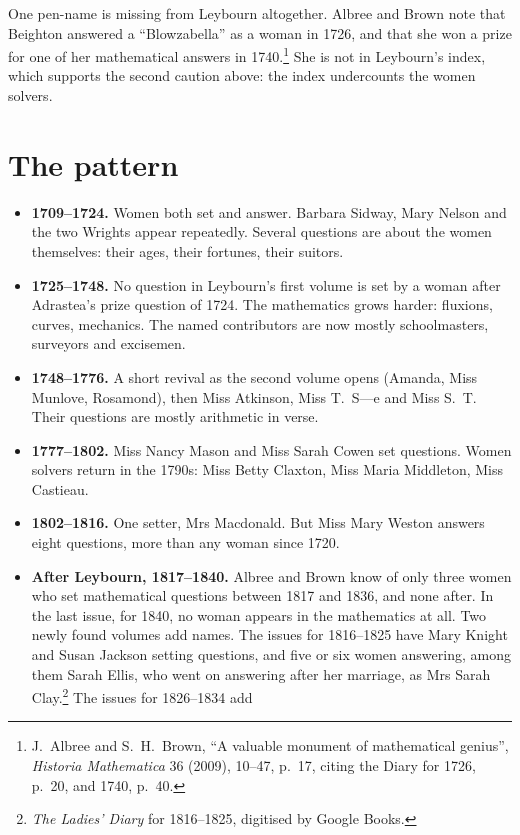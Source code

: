 \documentclass[11pt,a4paper]{article}
\begin{document}
One pen-name is missing from Leybourn altogether. Albree and Brown note that Beighton
answered a ``Blowzabella'' as a woman in 1726, and that she won a prize for one of her
mathematical answers in 1740.\footnote{J.~Albree and S.~H.~Brown, ``A valuable monument of mathematical genius'', \textit{Historia Mathematica} 36 (2009), 10--47, p.~17, citing the Diary for 1726,
p.~20, and 1740, p.~40.} She is not in Leybourn's index, which supports the second
caution above: the index undercounts the women solvers.

\section*{The pattern}

\begin{itemize}
\item \textbf{1709--1724.} Women both set and answer. Barbara Sidway, Mary Nelson and the
two Wrights appear repeatedly. Several questions are about the women themselves: their
ages, their fortunes, their suitors.
\item \textbf{1725--1748.} No question in Leybourn's first volume is set by a woman after
Adrastea's prize question of 1724. The mathematics grows harder: fluxions, curves,
mechanics. The named contributors are now mostly schoolmasters, surveyors and excisemen.
\item \textbf{1748--1776.} A short revival as the second volume opens (Amanda, Miss
Munlove, Rosamond), then Miss Atkinson, Miss T.~S---e and Miss S.~T. Their questions are
mostly arithmetic in verse.
\item \textbf{1777--1802.} Miss Nancy Mason and Miss Sarah Cowen set questions. Women
solvers return in the 1790s: Miss Betty Claxton, Miss Maria Middleton, Miss Castieau.
\item \textbf{1802--1816.} One setter, Mrs Macdonald. But Miss Mary Weston answers eight
questions, more than any woman since 1720.
\item \textbf{After Leybourn, 1817--1840.} Albree and Brown know of only three women who
set mathematical questions between 1817 and 1836, and none after. In the last issue,
for 1840, no woman appears in the mathematics at all. Two newly found volumes add names. The issues for 1816--1825 have Mary Knight and
Susan Jackson setting questions, and five or six women answering, among them Sarah Ellis,
who went on answering after her marriage, as Mrs Sarah Clay.\footnote{\textit{The
Ladies' Diary} for 1816--1825, digitised by Google Books.} The issues for 1826--1834 add

\end{itemize}
\end{document}
